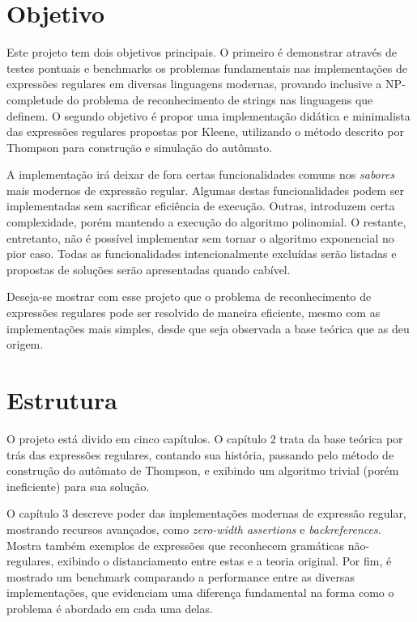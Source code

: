 \documentclass[a4paper,12pt,oneside,onecolumn]{uerj}
\begin{document}
\section{Objetivo}

Este projeto tem dois objetivos principais. O primeiro é demonstrar através de testes pontuais e benchmarks os problemas fundamentais nas implementações de expressões regulares em diversas linguagens modernas, provando inclusive a NP-completude do problema de reconhecimento de strings nas linguagens que definem. O segundo objetivo é propor uma implementação didática e minimalista das expressões regulares propostas por Kleene, utilizando o método descrito por Thompson para construção e simulação do autômato. 

A implementação irá deixar de fora certas funcionalidades comuns nos \emph{sabores} mais modernos de expressão regular. Algumas destas funcionalidades podem ser implementadas sem sacrificar eficiência de execução. Outras, introduzem certa complexidade, porém mantendo a execução do algoritmo polinomial. O restante, entretanto, não é possível implementar sem tornar o algoritmo exponencial no pior caso. Todas as funcionalidades intencionalmente excluídas serão listadas e propostas de soluções serão apresentadas quando cabível.

Deseja-se mostrar com esse projeto que o problema de reconhecimento de expressões regulares pode ser resolvido de maneira eficiente, mesmo com as implementações mais simples, desde que seja observada a base teórica que as deu origem.

\section{Estrutura}

O projeto está divido em cinco capítulos. O capítulo 2 trata da base teórica por trás das expressões regulares, contando sua história, passando pelo método de construção do autômato de Thompson, e exibindo um algoritmo trivial (porém ineficiente) para sua solução.

O capítulo 3 descreve poder das implementações modernas de expressão regular, mostrando recursos avançados, como \emph{zero-width assertions} e \emph{backreferences}. Mostra também exemplos de expressões que reconhecem gramáticas não-regulares, exibindo o distanciamento entre estas e a teoria original. Por fim, é mostrado um benchmark comparando a performance entre as diversas implementações, que evidenciam uma diferença fundamental na forma como o problema é abordado em cada uma delas.
\end{document}
